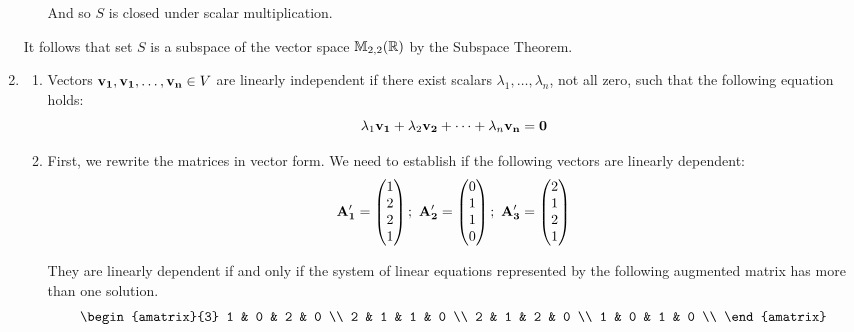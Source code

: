 \begin{enumerate}
\begin{itemize}
                And so $S$ is closed under scalar multiplication.
        \end{itemize}

        It follows that set $S$ is a subspace of the vector
        space $\mathbb{M}_{2,2}(\mathbb{R})$ by the Subspace Theorem.

    \item
        \begin{enumerate}
            \item
                Vectors $\mathbf{v_1}, \mathbf{v_1}, \dots, \mathbf{v_n} \in V$ are
                linearly independent if there exist scalars
                $\lambda_1, \dots, \lambda_n$, not all zero,
                such that the following equation holds:
                $$\lambda_1\mathbf{v_1} + \lambda_2\mathbf{v_2} + \dots + \lambda_n\mathbf{v_n} = \mathbf{0}$$
            \item
                First, we rewrite the matrices in vector form. We need
                to establish if the following vectors are linearly
                dependent:
                $$
                \mathbf{A'_1} = \begin{pmatrix}1 \\ 2 \\ 2 \\ 1\end{pmatrix};~
                \mathbf{A'_2} = \begin{pmatrix}0 \\ 1 \\ 1 \\ 0\end{pmatrix};~
                \mathbf{A'_3} = \begin{pmatrix}2 \\ 1 \\ 2 \\ 1\end{pmatrix}
                $$

                They are linearly dependent if and only if the system of
                linear equations represented by the following augmented
                matrix has more than one solution.
                $$
                    \begin{amatrix}{3}
                        1 & 0 & 2 & 0 \\
                        2 & 1 & 1 & 0 \\
                        2 & 1 & 2 & 0 \\
                        1 & 0 & 1 & 0 \\
                    \end{amatrix}
                $$


\end{enumerate}
\end{enumerate}
